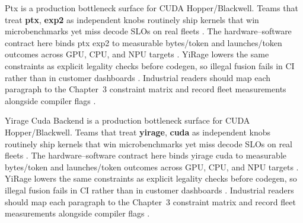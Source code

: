Ptx is a production bottleneck surface for CUDA Hopper/Blackwell. Teams that treat \textbf{ptx}, \textbf{exp2} as independent knobs routinely ship kernels that win microbenchmarks yet miss decode SLOs on real fleets \citep{taxbreak2026,semianalysis2024tma}. The hardware--software contract here binds ptx exp2 to measurable bytes/token and launches/token outcomes across GPU, CPU, and NPU targets \citep{memoryfloor2026,amd2024xdna}. YiRage lowers the same constraints as explicit legality checks before codegen, so illegal fusion fails in CI rather than in customer dashboards \citep{nvidia2022hopper,amd2024aie}. Industrial readers should map each paragraph to the Chapter~3 constraint matrix and record fleet measurements alongside compiler flags \citep{semianalysis2024tma,dlbook}.

Yirage Cuda Backend is a production bottleneck surface for CUDA Hopper/Blackwell. Teams that treat \textbf{yirage}, \textbf{cuda} as independent knobs routinely ship kernels that win microbenchmarks yet miss decode SLOs on real fleets \citep{memoryfloor2026,amd2024xdna}. The hardware--software contract here binds yirage cuda to measurable bytes/token and launches/token outcomes across GPU, CPU, and NPU targets \citep{nvidia2022hopper,amd2024aie}. YiRage lowers the same constraints as explicit legality checks before codegen, so illegal fusion fails in CI rather than in customer dashboards \citep{semianalysis2024tma,dlbook}. Industrial readers should map each paragraph to the Chapter~3 constraint matrix and record fleet measurements alongside compiler flags \citep{amd2024xdna,dao2022flashattention}.

